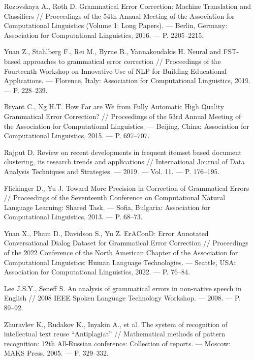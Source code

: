 \newpage


\begin{thebibliography}{99}

Rozovskaya A., Roth D. Grammatical Error Correction: Machine Translation and Classifiers // Proceedings of the 54th Annual Meeting of the Association for Computational Linguistics (Volume 1: Long Papers). — Berlin, Germany: Association for Computational Linguistics, 2016. — P. 2205–2215.

Yuan Z., Stahlberg F., Rei M., Byrne B., Yannakoudakis H. Neural and FST-based approaches to grammatical error correction // Proceedings of the Fourteenth Workshop on Innovative Use of NLP for Building Educational Applications. — Florence, Italy: Association for Computational Linguistics, 2019. — P. 228–239.

Bryant C., Ng H.T. How Far are We from Fully Automatic High Quality Grammatical Error Correction? // Proceedings of the 53rd Annual Meeting of the Association for Computational Linguistics. — Beijing, China: Association for Computational Linguistics, 2015. — P. 697–707.

Rajput D. Review on recent developments in frequent itemset based document clustering, its research trends and applications // International Journal of Data Analysis Techniques and Strategies. — 2019. — Vol. 11. — P. 176–195.

Flickinger D., Yu J. Toward More Precision in Correction of Grammatical Errors // Proceedings of the Seventeenth Conference on Computational Natural Language Learning: Shared Task. — Sofia, Bulgaria: Association for Computational Linguistics, 2013. — P. 68–73.

Yuan X., Pham D., Davidson S., Yu Z. ErAConD: Error Annotated Conversational Dialog Dataset for Grammatical Error Correction // Proceedings of the 2022 Conference of the North American Chapter of the Association for Computational Linguistics: Human Language Technologies. — Seattle, USA: Association for Computational Linguistics, 2022. — P. 76–84.

Lee J.S.Y., Seneff S. An analysis of grammatical errors in non-native speech in English // 2008 IEEE Spoken Language Technology Workshop. — 2008. — P. 89–92.

Zhuravlev K., Rudakov K., Inyakin A., et al. The system of recognition of intellectual text reuse “Antiplagiat” // Mathematical methods of pattern recognition: 12th All-Russian conference: Collection of reports. — Moscow: MAKS Press, 2005. — P. 329–332.


\end{thebibliography}
